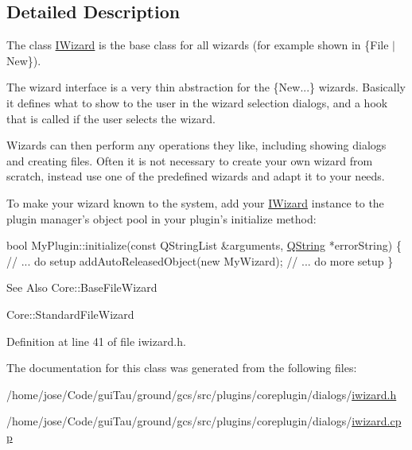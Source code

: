 \subsection{Detailed Description}
The class \hyperlink{class_core_1_1_i_wizard}{I\-Wizard} is the base class for all wizards (for example shown in  \{File $|$ New\}). 

The wizard interface is a very thin abstraction for the \{New...\} wizards. Basically it defines what to show to the user in the wizard selection dialogs, and a hook that is called if the user selects the wizard.

Wizards can then perform any operations they like, including showing dialogs and creating files. Often it is not necessary to create your own wizard from scratch, instead use one of the predefined wizards and adapt it to your needs.

To make your wizard known to the system, add your \hyperlink{class_core_1_1_i_wizard}{I\-Wizard} instance to the plugin manager's object pool in your plugin's initialize method\-: 
\begin{DoxyCode}
\textcolor{keywordtype}{bool} MyPlugin::initialize(\textcolor{keyword}{const} QStringList &arguments, \hyperlink{group___u_a_v_objects_plugin_gab9d252f49c333c94a72f97ce3105a32d}{QString} *errorString)
\{
    \textcolor{comment}{// ... do setup}
    addAutoReleasedObject(\textcolor{keyword}{new} MyWizard);
    \textcolor{comment}{// ... do more setup}
\}
\end{DoxyCode}
 \begin{DoxySeeAlso}{See Also}
Core\-::\-Base\-File\-Wizard 

Core\-::\-Standard\-File\-Wizard 
\end{DoxySeeAlso}


Definition at line 41 of file iwizard.\-h.



The documentation for this class was generated from the following files\-:\begin{DoxyCompactItemize}
\item 
/home/jose/\-Code/gui\-Tau/ground/gcs/src/plugins/coreplugin/dialogs/\hyperlink{iwizard_8h}{iwizard.\-h}\item 
/home/jose/\-Code/gui\-Tau/ground/gcs/src/plugins/coreplugin/dialogs/\hyperlink{iwizard_8cpp}{iwizard.\-cpp}\end{DoxyCompactItemize}
